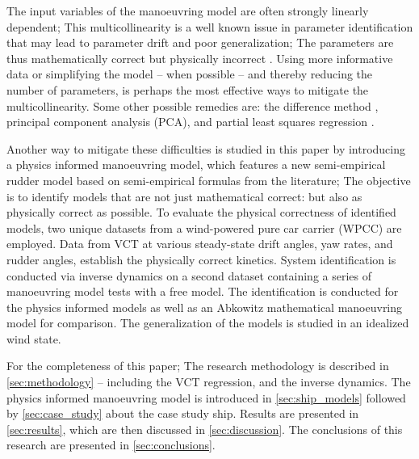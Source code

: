 %
The input variables of the manoeuvring model are often strongly linearly dependent; This multicollinearity is a well known issue in parameter identification that may lead to parameter drift and poor generalization; The parameters are thus mathematically correct but physically incorrect \citep{luo_parameter_2016}. 
Using more informative data or simplifying the model -- when possible -- and thereby reducing the number of parameters, is perhaps the most effective ways to mitigate the multicollinearity.
Some other possible remedies are: the difference method \citep{luo_parameter_2016}, principal component analysis (PCA), and partial least squares regression \citep{jian-chuan_parametric_2015}. 

Another way to mitigate these difficulties is studied in this paper by introducing a physics informed manoeuvring model, which features a new semi-empirical rudder model based on semi-empirical formulas from the literature;
The objective is to identify models that are not just mathematical correct: but also as physically correct as possible.
To evaluate the physical correctness of identified models, two unique datasets from a wind-powered pure car carrier (WPCC) are employed. Data from VCT at various steady-state drift angles, yaw rates, and rudder angles, establish the physically correct kinetics. System identification is conducted via inverse dynamics \citep{faber_inverse_2018} on a second dataset containing a series of manoeuvring model tests with a free model. The identification is conducted for the physics informed models as well as an Abkowitz mathematical manoeuvring model for comparison. The generalization of the models is studied in an idealized wind state.

For the completeness of this paper; The research methodology is described in \autoref{sec:methodology} -- including the VCT regression, and the inverse dynamics. The physics informed manoeuvring model is introduced in \autoref{sec:ship_models} followed by \autoref{sec:case_study} about the case study ship. Results are presented in \autoref{sec:results}, which are then discussed in \autoref{sec:discussion}. The conclusions of this research are presented in \autoref{sec:conclusions}.

